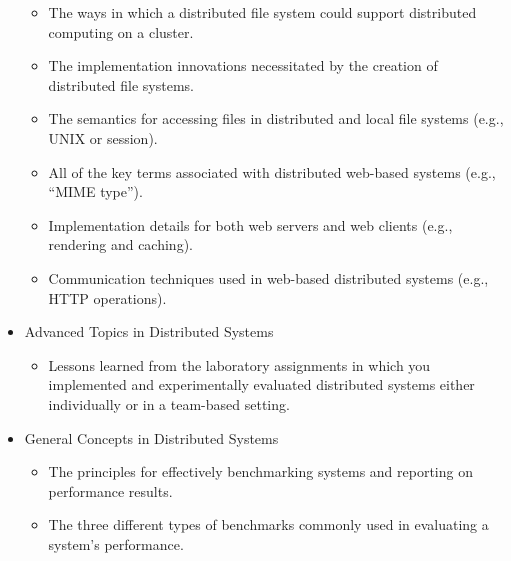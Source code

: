 \begin{itemize}[leftmargin=0.25in]
\begin{itemize}[leftmargin=0in]
      \item The ways in which a distributed file system could support distributed computing on a cluster.

      \item The implementation innovations necessitated by the creation of distributed file systems.

      \item The semantics for accessing files in distributed and local file systems (e.g., UNIX or session).

      \item All of the key terms associated with distributed web-based systems (e.g., ``MIME type'').

      \item Implementation details for both web servers and web clients (e.g., rendering and caching).

      \item Communication techniques used in web-based distributed systems (e.g., HTTP operations).

    \end{itemize}

  \item Advanced Topics in Distributed Systems

    \vspace*{-.05in}
    \begin{itemize}[leftmargin=0in]

      \itemsep 0in

      \item Lessons learned from the laboratory assignments in which you implemented and experimentally evaluated
        distributed systems either individually or in a team-based setting.

    \end{itemize}

  \item General Concepts in Distributed Systems

    \vspace*{-.05in}
    \begin{itemize}[leftmargin=0in]

      \itemsep 0in

      \item The principles for effectively benchmarking systems and reporting on performance results.

      \item The three different types of benchmarks commonly used in evaluating a system's performance.


\end{itemize}
\end{itemize}
